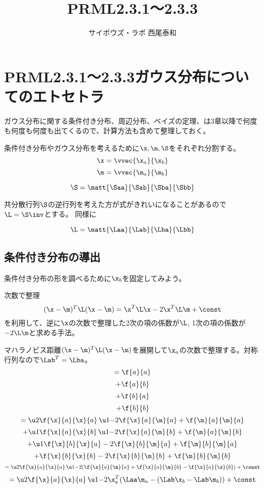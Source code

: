 \documentclass[a4paper]{jsarticle}
\begin{document}
\title{PRML2.3.1〜2.3.3}
\author{サイボウズ・ラボ 西尾泰和}
\maketitle
\section{PRML2.3.1〜2.3.3ガウス分布についてのエトセトラ}

ガウス分布に関する条件付き分布、周辺分布、ベイズの定理、は3章以降で何度も何度も何度も出てくるので、計算方法も含めて整理しておく。


条件付き分布やガウス分布を考えるために$\x, \m, \S$をそれぞれ分割する。
\[ \x = \vvec{\x_a}{\x_b}\]
\[ \m = \vvec{\m_a}{\m_b}\]

\[ \S = \matt{\Saa}{\Sab}{\Sba}{\Sbb}\]

共分散行列$\S$の逆行列を考えた方が式がきれいになることがあるので$\L = \S\inv$とする。
同様に

\[ \L = \matt{\Laa}{\Lab}{\Lba}{\Lbb}\]


\subsection{条件付き分布の導出}
条件付き分布の形を調べるために$\x_b$を固定してみよう。
\begin{itembox}[l]{次数で整理}
\[ (\x - \m)^T \L (\x - \m) = \x^T \L \x - 2 \x^T\L\m + \const \]
を利用して、逆に$\x$の次数で整理した2次の項の係数が$\L$, 1次の項の係数が$-2\L\m$と求める手法。
\end{itembox}

マハラノビス距離$(\x - \m)^T \L (\x - \m)$を展開して$\x_a$の次数で整理する。対称行列なので$\Lab^T = \Lba$。
\[ = \f{a}{a} \]
\[ + \f{a}{b} \]
\[ + \f{b}{a} \]
\[ + \f{b}{b} \]
\[ = \u2{\f{\x}{a}{\x}{a}} \, \u1{- 2 \f{\x}{a}{\m}{a}} + \f{\m}{a}{\m}{a} \]
\[ + \u1{\f{\x}{a}{\x}{b}} \, \u1{- 2 \f{\x}{a}{\m}{b}} + \f{\m}{a}{\m}{b} \]
\[ + \u1{\f{\x}{b}{\x}{a}}        - 2 \f{\x}{b}{\m}{a}  + \f{\m}{b}{\m}{a} \]
\[ +     \f{\x}{b}{\x}{b}         - 2 \f{\x}{b}{\m}{b}  + \f{\m}{b}{\m}{b} \]
\[ = \u2{\f{\x}{a}{\x}{a}} \, \u1{- 2(\f{\x}{a}{\m}{a}  + \f{\x}{a}{\m}{b} - \f{\x}{a}{\x}{b})} + \const\]
\[ = \u2{\f{\x}{a}{\x}{a}} \, \u1{ -2 \x_a^T(\Laa\m_a - (\Lab \x_b - \Lab \m_b)) } + \const \]
\end{document}
